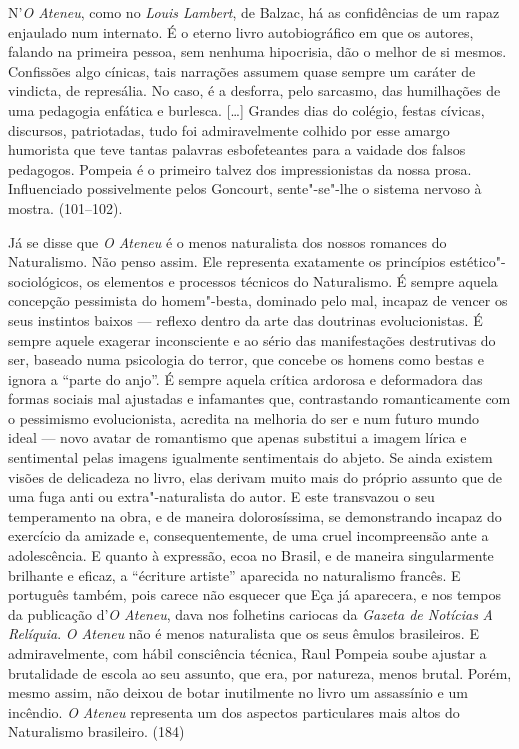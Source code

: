 

N'\textit{O Ateneu}, como no
\textit{Louis Lambert}, de Balzac, há as
confidências de um rapaz enjaulado num internato. É o eterno livro
autobiográfico em que os autores, falando na primeira pessoa, sem
nenhuma hipocrisia, dão o melhor de si mesmos. Confissões algo cínicas,
tais narrações assumem quase sempre um caráter de vindicta, de
represália. No caso, é a desforra, pelo sarcasmo, das humilhações de
uma pedagogia enfática e burlesca. [\ldots] Grandes dias do colégio,
festas cívicas, discursos, patriotadas, tudo foi admiravelmente colhido
por esse amargo humorista que teve tantas palavras esbofeteantes para a
vaidade dos falsos pedagogos. Pompeia é o primeiro talvez dos
impressionistas da nossa prosa. Influenciado possivelmente pelos
Goncourt, sente"-se"-lhe o sistema nervoso à mostra. (101--102).



Já se disse que \textit{O Ateneu} é o menos naturalista dos nossos romances do
Naturalismo. Não penso assim. Ele representa exatamente os princípios
estético"-sociológicos, os elementos e processos técnicos do
Naturalismo. É sempre aquela concepção pessimista do homem"-besta,
dominado pelo mal, incapaz de vencer os seus instintos baixos --- reflexo
dentro da arte das doutrinas evolucionistas. É sempre aquele exagerar
inconsciente e ao sério das manifestações destrutivas do ser, baseado
numa psicologia do terror, que concebe os homens como bestas e ignora a
``parte do anjo''. É sempre aquela crítica ardorosa e deformadora das
formas sociais mal ajustadas e infamantes que, contrastando
romanticamente com o pessimismo evolucionista, acredita na melhoria do
ser e num futuro mundo ideal --- novo avatar de romantismo que apenas
substitui a imagem lírica e sentimental pelas imagens igualmente
sentimentais do abjeto. Se ainda existem visões de delicadeza no livro,
elas derivam muito mais do próprio assunto que de uma fuga anti ou
extra"-naturalista do autor. E este transvazou o seu temperamento na
obra, e de maneira dolorosíssima, se demonstrando incapaz do exercício
da amizade e, consequentemente, de uma cruel incompreensão ante a
adolescência. E quanto à expressão, ecoa no Brasil, e de maneira
singularmente brilhante e eficaz, a ``écriture artiste'' aparecida no
naturalismo francês. E português também, pois carece não esquecer que
Eça já aparecera, e nos tempos da publicação
d'\textit{O Ateneu}, dava nos folhetins cariocas
da \textit{Gazeta de Notícias} \textit{A Relíquia}. \textit{O
Ateneu} não é menos naturalista que os seus êmulos
brasileiros. E admiravelmente, com hábil consciência técnica, Raul
Pompeia soube ajustar a brutalidade de escola ao seu assunto, que era,
por natureza, menos brutal. Porém, mesmo assim, não deixou de botar
inutilmente no livro um assassínio e um incêndio. \textit{O
Ateneu} representa um dos aspectos particulares mais
altos do Naturalismo brasileiro. (184)  

